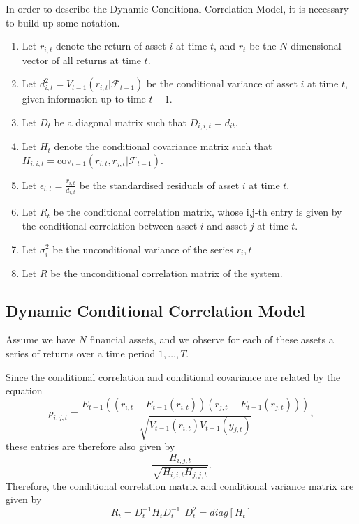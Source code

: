 \documentclass{article} %
\numberwithin{equation}{section} %
\numberwithin{figure}{section} %
\numberwithin{table}{section} %
\begin{document}
In order to describe the Dynamic Conditional Correlation Model, it is necessary to build up some notation.
\begin{enumerate}
  \item Let $r_{i,t}$ denote the return of asset $i$ at time $t$, and $r_t$ be the $N$-dimensional vector of all returns at time $t$.
  \item Let $d_{i,t}^2 = V_{t-1}(r_{i,t} | \mathcal{F}_{t-1})$ be the conditional variance of asset $i$ at time $t$, given information up to time $t-1$.
  \item Let $D_t$ be a diagonal matrix such that $D_{i,i,t} = d_{it}$.
  \item Let $H_t$ denote the conditional covariance matrix such that $H_{i,i,t} = \text{cov}_{t-1}(r_{i,t}, r_{j,t} | \mathcal{F}_{t-1})$.
  \item Let $\epsilon_{i,t} = \frac{r_{i,t}}{d_{i,t}}$ be the standardised residuals of asset $i$ at time $t$.
  \item Let $R_t$ be the conditional correlation matrix, whose i,j-th entry is given by the conditional correlation between asset $i$ and asset $j$ at time $t$.
  \item Let $\sigma_i^2$ be the unconditional variance of the series $r_i,t$
  \item Let $R$ be the unconditional correlation matrix of the system.
\end{enumerate}


\subsection{Dynamic Conditional Correlation Model}

Assume we have $N$ financial assets, and we observe for each of these assets a series of returns over a time period $1, \ldots , T$.

Since the conditional correlation and conditional covariance are related by the equation
\begin{equation}
  \rho_{i,j,t} = \frac{E_{t-1}((r_{i,t} - E_{t-1}(r_{i,t}))(r_{j,t} - E_{t-1}(r_{j,t})))}
                      {\sqrt{V_{t-1}(r_{i,t})V_{t-1}(y_{j,t})}},
\end{equation}
these entries are therefore also given by
\begin{equation}
  \frac{H_{i,j,t}}{\sqrt{H_{i,i,t}H_{j,j,t}}}.
\end{equation}
Therefore, the conditional correlation matrix and conditional variance matrix are given by
\begin{equation}
  R_t = D_t^{-1} H_t D_t ^{-1} \ \  D_t ^2 = diag[H_t]
\end{equation}
\end{document}
